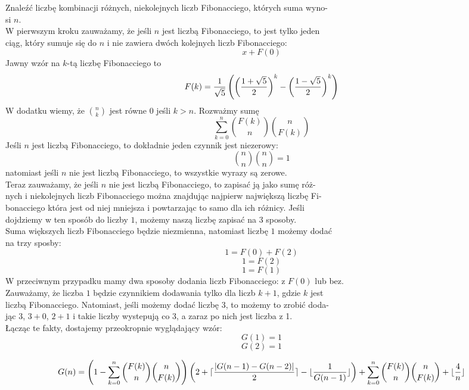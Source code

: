 \documentclass{article}
\begin{document}
\ttfamily
Znaleźć liczbę kombinacji różnych, niekolejnych liczb Fibonacciego, których suma wyno-\\si $n$.\bigskip\\
W pierwszym kroku zauważamy, że jeśli $n$ jest liczbą Fibonacciego, to jest tylko jeden \\ciąg, który sumuje się do $n$ i nie zawiera dwóch kolejnych liczb Fibonacciego:
$$x+F(0)$$
Jawny wzór na $k$-tą liczbę Fibonacciego to
$$F(k)=\frac{1}{\sqrt{5}}\left(\left({1+\sqrt{5}\over 2}\right)^k-\left({1-\sqrt{5}\over 2}\right)^k\right)$$
W dodatku wiemy, że ${n\choose k}$ jest równe $0$ jeśli $k>n$. Rozważmy sumę
$$\sum\limits_{k=0}^n{F(k)\choose n}{n\choose F(k)}$$
Jeśli $n$ jest liczbą Fibonacciego, to dokładnie jeden czynnik jest niezerowy:
$${n\choose n}{n\choose n}=1$$
natomiast jeśli $n$ nie jest liczbą Fibonacciego, to wszystkie wyrazy są zerowe.\bigskip\\
Teraz zauważamy, że jeśli $n$ nie jest liczbą Fibonacciego, to zapisać ją jako sumę róż-\\nych i niekolejnych liczb Fibonacciego można znajdując najpierw największą liczbę Fi-\\bonacciego która jest od niej mniejsza i powtarzając to samo dla ich różnicy. Jeśli \\dojdziemy w ten sposób do liczby $1$, możemy naszą liczbę zapisać na 3 sposoby.\smallskip\\
Suma większych liczb Fibonacciego będzie niezmienna, natomiast liczbę $1$ możemy dodać \\na trzy sposby:
$$1=F(0)+F(2)$$
$$1=F(2)$$
$$1=F(1)$$
W przeciwnym przypadku mamy dwa sposoby dodania liczb Fibonacciego: z $F(0)$ lub bez.\smallskip\\
Zauważamy, że liczba $1$ będzie czynnikiem dodawania tylko dla liczb $k+1$, gdzie $k$ jest \\liczbą Fibonacciego. Natomiast, jeśli możemy dodać liczbę $3$, to możemy to zrobić doda-\\jąc $3$, $3+0$, $2+1$ i takie liczby wystepują co 3, a zaraz po nich jest liczba z 1.\bigskip\\
Łącząc te fakty, dostajemy przeokropnie wyglądający wzór:
$$G(1)=1$$
$$G(2)=1$$

$$G(n)=\left(1-\sum\limits_{k=0}^n{F(k)\choose n}{n\choose F(k)}\right)\left(2+\lceil{|G(n-1)-G(n-2)|\over2}\rceil -\lfloor\frac1{G(n-1)} \rfloor\right)+\sum\limits_{k=0}^n{F(k)\choose n}{n\choose F(k)}+\lfloor\frac4n\rfloor$$
\end{document}
